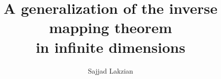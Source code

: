 \documentclass[a4, 12pt,leqno]{amsart}
\theoremstyle{plain}
\theoremstyle{definition}
\theoremstyle{remark}
\numberwithin{equation}{section}
\begin{document}
\title[\tiny A generalization of the inverse mapping theorem in infinite dimensions]{\small  A generalization of the inverse mapping theorem \\ \small in infinite dimensions} %

\author[Sajjad Lakzian]{Sajjad Lakzian}
\address{ -- Sajjad Lakzian \newline \phantom{s} Department of Mathematical Sciences\newline \phantom{s} Isfahan University of  Technology (IUT) \newline \phantom{s} Isfahan 8415683111, Iran}





%
%

\end{document}
